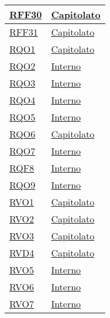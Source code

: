 \begin{longtable}{|>{\centering}m{5cm}|m{5cm}<{\centering}|}
\hyperlink{RFF30}{RFF30} & \hyperlink{Capitolato}{Capitolato}\\ \hline

\hyperlink{RFF31}{RFF31} & \hyperlink{Capitolato}{Capitolato}\\ \hline

\hyperlink{RQO1}{RQO1} & \hyperlink{Capitolato}{Capitolato}\\ \hline

\hyperlink{RQO2}{RQO2} & \hyperlink{Interno}{Interno}\\ \hline

\hyperlink{RQO3}{RQO3} & \hyperlink{Interno}{Interno}\\ \hline

\hyperlink{RQO4}{RQO4} & \hyperlink{Interno}{Interno}\\ \hline

\hyperlink{RQO5}{RQO5} & \hyperlink{Interno}{Interno}\\ \hline

\hyperlink{RQO6}{RQO6} & \hyperlink{Capitolato}{Capitolato}\\ \hline

\hyperlink{RQO7}{RQO7} & \hyperlink{Interno}{Interno}\\ \hline

\hyperlink{RQF8}{RQF8} & \hyperlink{Interno}{Interno}\\ \hline

\hyperlink{RQO9}{RQO9} & \hyperlink{Interno}{Interno}\\ \hline

\hyperlink{RVO1}{RVO1} & \hyperlink{Capitolato}{Capitolato}\\ \hline

\hyperlink{RVO2}{RVO2} & \hyperlink{Capitolato}{Capitolato}\\ \hline

\hyperlink{RVO3}{RVO3} & \hyperlink{Capitolato}{Capitolato}\\ \hline

\hyperlink{RVD4}{RVD4} & \hyperlink{Capitolato}{Capitolato}\\ \hline

\hyperlink{RVO5}{RVO5} & \hyperlink{Interno}{Interno}\\ \hline

\hyperlink{RVO6}{RVO6} & \hyperlink{Interno}{Interno}\\ \hline

\hyperlink{RVO7}{RVO7} & \hyperlink{Interno}{Interno}\\ \hline


\end{longtable}
